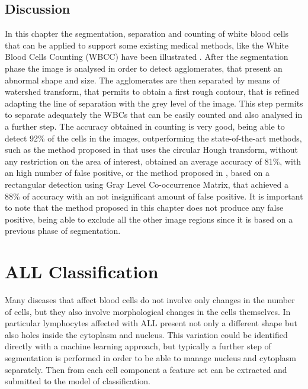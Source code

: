 \documentclass[final,a4paper,12pt,english]{UnicaPhdThesis3}
\begin{document}
	\section{Discussion}
	In this chapter the segmentation, separation and counting of white blood cells that can be applied to support some existing medical methods, like the White Blood Cells Counting (\acs{WBCC}) have been illustrated . After the segmentation phase the image is analysed in order to detect agglomerates, that present an abnormal shape and size. The agglomerates are then separated by means of watershed transform, that permits to obtain a first rough contour, that is refined adapting the line of separation with the grey level of the image. This step permits to separate adequately the WBCs that can be easily counted and also analysed in a further step. The accuracy obtained in counting is very good, being able to detect 92\% of the cells in the images, outperforming the state-of-the-art methods, such as the method proposed in \cite{Mahmood} that uses the circular Hough transform, without any restriction on the area of interest, obtained an average accuracy of 81\%, with an high number of false positive, or the method proposed in \cite{Alilou}, based on a rectangular detection using Gray Level Co-occurrence Matrix, that achieved a 88\% of accuracy with an not insignificant amount of false positive. It is important to note that the method proposed in this chapter does not produce any false positive, being able to exclude all the other image regions since it is based on a previous phase of segmentation. 
	
	\chapter{ALL Classification}
	Many diseases that affect blood cells do not involve only changes in the number of cells, but they also involve morphological changes in the cells themselves. In particular lymphocytes affected with ALL present not only a different shape but also holes inside the cytoplasm and nucleus. This variation could be identified directly with a machine learning approach, but typically a further step of segmentation is performed in order to be able to manage nucleus and cytoplasm separately. Then from each cell component a feature set can be extracted and submitted to the model of classification. 
	
\end{document}
